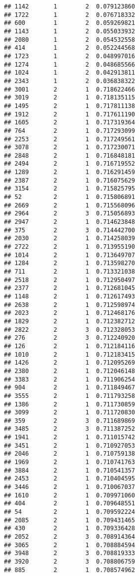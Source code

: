 \documentclass[
]{article}
\begin{document}
\begin{verbatim}
## 1142       1        2  0.079123860
## 1722       1        2  0.076718332
## 600        1        2  0.059269821
## 1143       1        2  0.055033932
## 2080       1        2  0.054532558
## 414        1        2  0.052244568
## 1723       1        2  0.048997016
## 1274       1        2  0.048685566
## 1024       1        2  0.042913811
## 2343       1        2  0.036838322
## 3001       2        1  0.718622466
## 3019       2        1  0.718135115
## 1495       2        1  0.717811138
## 1912       2        1  0.717611190
## 1605       2        1  0.717319364
## 764        2        1  0.717293099
## 2253       2        1  0.717249561
## 3078       2        1  0.717230071
## 2848       2        1  0.716848181
## 2494       2        1  0.716719552
## 1289       2        1  0.716291459
## 2387       2        1  0.716075629
## 3154       2        1  0.715825795
## 52         2        1  0.715806891
## 2669       2        1  0.715568096
## 2964       2        3  0.715056893
## 2947       2        1  0.714623848
## 375        2        3  0.714442700
## 2030       2        1  0.714258039
## 2722       2        1  0.713955190
## 1014       2        1  0.713649707
## 1284       2        1  0.713598270
## 711        2        1  0.713321038
## 2518       2        1  0.712950497
## 2377       2        1  0.712681045
## 1148       2        1  0.712617493
## 2638       2        1  0.712598974
## 2023       2        1  0.712468176
## 1829       2        1  0.712382712
## 2822       2        3  0.712328053
## 276        2        3  0.712240920
## 126        2        1  0.712184116
## 1010       2        1  0.712183415
## 1426       2        1  0.712095269
## 2380       2        1  0.712046148
## 3383       2        1  0.711906254
## 904        2        1  0.711849467
## 3555       2        1  0.711793258
## 1386       2        1  0.711730859
## 3099       2        1  0.711720830
## 359        2        3  0.711689869
## 3485       2        3  0.711387252
## 1941       2        1  0.711015742
## 3451       2        1  0.710927053
## 2046       2        1  0.710759138
## 1969       2        1  0.710741763
## 3884       2        1  0.710541357
## 2453       2        1  0.710404595
## 3446       2        1  0.710067037
## 1610       2        1  0.709971060
## 404        2        1  0.709648551
## 54         2        1  0.709592224
## 2085       2        1  0.709431465
## 430        2        1  0.709336428
## 2052       2        3  0.708914364
## 3065       2        1  0.708884594
## 3948       2        3  0.708819333
## 3920       2        3  0.708806759
## 885        2        1  0.708574962

\end{verbatim}
\end{document}
